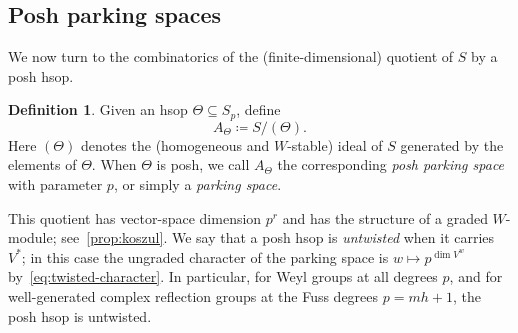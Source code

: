 \documentclass[10pt,a4paper]{amsart}
\newcommand{\defeq}{\coloneqq}
\newcommand{\defn}[1]{\emph{\color{darkblue}#1}}
\theoremstyle{definition}
\newtheorem{definition}[theorem]{Definition}
\newcommand{\nathan}[1]{\todo[size=\tiny,color=green!30]{#1 \\ \hfill --- N.}}
\newcommand{\Nathan}[1]{\todo[size=\tiny,inline,color=green!30]{#1
      \\ \hfill --- N.}}
\begin{document}


%




\subsection{Posh parking spaces}
We now turn to the combinatorics of the (finite-dimensional) quotient of $S$ by a posh hsop.
\begin{definition}
Given an hsop $\Theta\subseteq S_p$, define
\[
 A_\Theta\defeq S/(\Theta).
\]
Here $(\Theta)$ denotes the (homogeneous and $W$-stable) ideal of $S$ generated by the elements
of $\Theta$.  %
When $\Theta$ is posh, we call $A_\Theta$ the corresponding
\defn{posh parking space} with parameter $p$, or simply a \defn{parking space}.
\label{def:parking_space}
\end{definition}
This quotient has vector-space dimension $p^r$ and has the
structure of a graded $W$-module; see~\cref{prop:koszul}.
We say that a posh hsop is \defn{untwisted} when it
carries $V^*$; in this case the ungraded character of the parking space is
$w\mapsto p^{\dim V^w}$ by~\cref{eq:twisted-character}.  In particular, for Weyl groups at all degrees $p$, and for well-generated complex reflection groups at the Fuss degrees $p=mh+1$, the posh hsop is untwisted.
\end{document}
